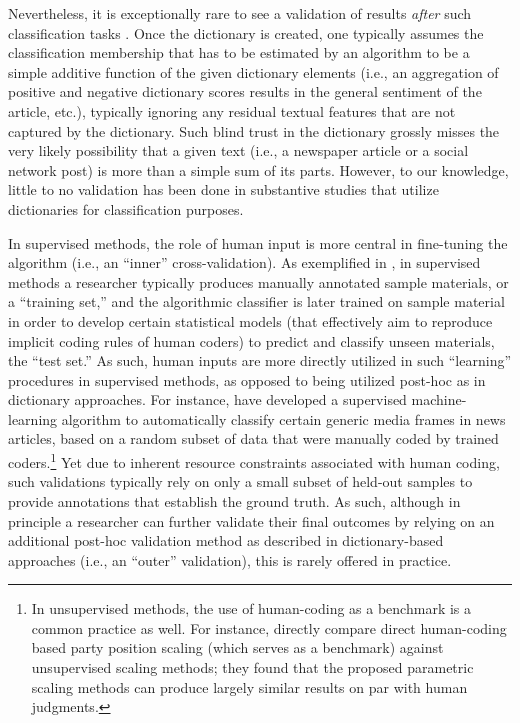 \documentclass[man, 12pt, a4paper, nolmodern, noextraspace]{apa6}
\begin{document}
    Nevertheless, it is exceptionally rare to see a validation of results \textit{after} such classification tasks \parencites[yet for notable exceptions, see][]{muddiman2018re, YoungSoroka2012, gonzalez2015signals}. Once the dictionary is created, one typically assumes the classification membership that has to be estimated by an algorithm to be a simple additive function of the given dictionary elements (i.e., an aggregation of positive and negative dictionary scores results in the general sentiment of the article, etc.), typically ignoring any residual textual features that are not captured by the dictionary. Such blind trust in the dictionary grossly misses the very likely possibility that a given text (i.e., a newspaper article or a social network post) is more than a simple sum of its parts. However, to our knowledge, little to no validation has been done in substantive studies that utilize dictionaries for classification purposes.
    
    In supervised methods, the role of human input is more central in fine-tuning the algorithm (i.e., an \enquote{inner} cross-validation). As exemplified in \textcite{scharkow2013thematic}, in supervised methods a researcher typically produces manually annotated sample materials, or a \enquote{training set,} and the algorithmic classifier is later trained on sample material in order to develop certain statistical models (that effectively aim to reproduce implicit coding rules of human coders) to predict and classify unseen materials, the \enquote{test set.} As such, human inputs are more directly utilized in such \enquote{learning} procedures in supervised methods, as opposed to being utilized post-hoc as in dictionary approaches. For instance, \textcite{burscher2014teaching} have developed a supervised machine-learning algorithm to automatically classify certain generic media frames in news articles, based on a random subset of data that were manually coded by trained coders.\footnote{In unsupervised methods, the use of human-coding as a benchmark is a common practice as well. For instance, \textcite{lowe2013validating} directly compare direct human-coding based party position scaling (which serves as a benchmark) against unsupervised scaling methods; they found that the proposed parametric scaling methods can produce largely similar results on par with human judgments.} Yet due to inherent resource constraints associated with human coding, such validations typically rely on only a small subset of held-out samples to provide annotations that establish the ground truth. As such, although in principle a researcher can further validate their final outcomes by relying on an additional post-hoc validation method as described in dictionary-based approaches (i.e., an \enquote{outer} validation), this is rarely offered in practice.   
    
\end{document}
